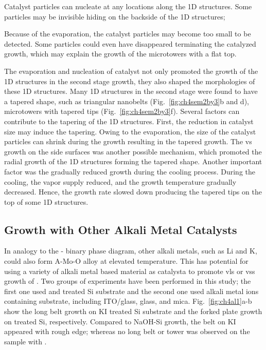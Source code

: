 \begin{enumerate*}[label=\itshape\alph*\upshape)]
\item Catalyst particles can nucleate at any locations along the 1D structures. Some particles may be invisible hiding on the backside of the 1D structures;
\item Because of the evaporation, the catalyst particles may become too small to be detected. Some particles could even have disappeared terminating the catalyzed growth, which may explain the growth of the microtowers with a flat top.
\end{enumerate*} The evaporation and nucleation of catalyst not only promoted the growth of the 1D structures in the second stage growth, they also shaped the morphologies of these 1D structures. Many 1D structures in the second stage were found to have a tapered shape, such as triangular nanobelts (Fig.~\ref{fig:ch4sem2by3}b and d), microtowers with tapered tips (Fig.~\ref{fig:ch4sem2by3}f). Several factors can contribute to the tapering of the 1D structures. First, the reduction in catalyst size may induce the tapering. Owing to the evaporation, the size of the catalyst particles can shrink during the growth resulting in the tapered growth. The \gls{vs} growth on the side surfaces was another possible mechanism, which promoted the radial growth of the 1D structures forming the tapered shape. Another important factor was the gradually reduced growth during the cooling process. During the cooling, the  vapor supply reduced, and the growth temperature gradually decreased. Hence, the growth rate slowed down producing the tapered tips on the top of some 1D structures.

\subsection{Growth with Other Alkali Metal Catalysts}\label{sec:glass}
In analogy to the - binary phase diagram, other alkali metals, such as Li and K, could also form A-Mo-O alloy at elevated temperature. This has potential for using a variety of alkali metal based material as catalysta to promote \gls{vls} or \gls{vss} growth of . Two groups of experiments have been performed in this study; the first one used  and  treated Si substrate and the second one used alkali metal ions containing substrate, including ITO/glass, glass, and mica. Fig.~\ref{fig:ch4al1}a-b show the long belt growth on KI treated Si substrate and the forked plate growth on  treated Si, respectively. Compared to NaOH-Si growth, the belt on KI appeared with rough edge; whereas no long belt or tower was observed on the sample with . 

